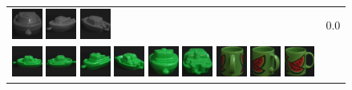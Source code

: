 {\begin{figure}[p]
\begin{tabular}{m{11cm} | m{3cm} |}
\includegraphics[width=1cm]{coil/beeld-26.eps}
\includegraphics[width=1cm]{coil/beeld-27.eps}
\includegraphics[width=1cm]{coil/beeld-28.eps}
& {\scriptsize 0.0}
\\
\includegraphics[width=1cm]{coil/beeld-54.eps}
\includegraphics[width=1cm]{coil/beeld-55.eps}
\includegraphics[width=1cm]{coil/beeld-57.eps}
\includegraphics[width=1cm]{coil/beeld-58.eps}
\includegraphics[width=1cm]{coil/beeld-56.eps}
\includegraphics[width=1cm]{coil/beeld-59.eps}
\includegraphics[width=1cm]{coil/beeld-35.eps}
\includegraphics[width=1cm]{coil/beeld-34.eps}
\includegraphics[width=1cm]{coil/beeld-30.eps}

\end{tabular}
\end{figure}}
